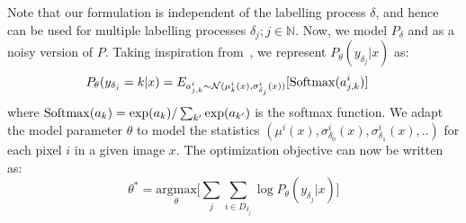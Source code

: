 Note that our formulation is independent of the labelling process $\delta$, and hence can be used for multiple labelling processes $\delta_j; j \in \mathbb{N}$.
Now, we model $P_\delta$ and as a noisy version of $P$. Taking inspiration from~\cite{gal_main}, 
we represent $P_\theta(y_{\delta_j} | x)$ as:
\begin{align}
    P_\theta(y_{\delta_j} = k | x) &= E_{a^{i}_{j,k} \sim \mathcal{N}(\mu^i_k(x), \sigma_{\delta_j}^i(x))}[\operatorname{Softmax}(a^{i}_{j,k})]
\end{align}
where $\operatorname{Softmax}(a_k) = \exp(a_k)/\sum_{k'}\exp(a_{k'})$ is the softmax function.
We adapt the model parameter $\theta$ to model the statistics $(\mu^i(x), \sigma_{\delta_0}^i(x),\sigma_{\delta_1}^i(x), .. )$ for each pixel $i$ in a given image $x$. The optimization objective can now be written as: 
\begin{equation}
    \theta^{*} =  \underset{\theta}{\mathrm{argmax}} \Bigg[ \sum_{j}{\sum_{i \in D_{{\delta_j}}}{\log P_\theta(y_{\delta_j} | x)}} \Bigg]
\end{equation}

